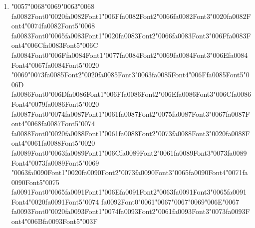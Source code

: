 \documentclass[11pt]{article}
\begin{document}
\begin{enumerate}[label=Q\arabic*., leftmargin=*]
\item {\char"0057}{\char"0068}{\char"0069}{\char"0063}{\char"0068} {\csname fa0082Font0\endcsname\char"0020}{\csname fa0082Font1\endcsname\char"006F}{\csname fa0082Font2\endcsname\char"0066}{\csname fa0082Font3\endcsname\char"0020}{\csname fa0082Font4\endcsname\char"0074}{\csname fa0082Font5\endcsname\char"0068} {\csname fa0083Font0\endcsname\char"0065}{\csname fa0083Font1\endcsname\char"0020}{\csname fa0083Font2\endcsname\char"0066}{\csname fa0083Font3\endcsname\char"006F}{\csname fa0083Font4\endcsname\char"006C}{\csname fa0083Font5\endcsname\char"006C} {\csname fa0084Font0\endcsname\char"006F}{\csname fa0084Font1\endcsname\char"0077}{\csname fa0084Font2\endcsname\char"0069}{\csname fa0084Font3\endcsname\char"006E}{\csname fa0084Font4\endcsname\char"0067}{\csname fa0084Font5\endcsname\char"0020} {\char"0069}{\char"0073}{\csname fa0085Font2\endcsname\char"0020}{\csname fa0085Font3\endcsname\char"0063}{\csname fa0085Font4\endcsname\char"006F}{\csname fa0085Font5\endcsname\char"006D} {\csname fa0086Font0\endcsname\char"006D}{\csname fa0086Font1\endcsname\char"006F}{\csname fa0086Font2\endcsname\char"006E}{\csname fa0086Font3\endcsname\char"006C}{\csname fa0086Font4\endcsname\char"0079}{\csname fa0086Font5\endcsname\char"0020} {\csname fa0087Font0\endcsname\char"0074}{\csname fa0087Font1\endcsname\char"0061}{\csname fa0087Font2\endcsname\char"0075}{\csname fa0087Font3\endcsname\char"0067}{\csname fa0087Font4\endcsname\char"0068}{\csname fa0087Font5\endcsname\char"0074} {\csname fa0088Font0\endcsname\char"0020}{\csname fa0088Font1\endcsname\char"0061}{\csname fa0088Font2\endcsname\char"0073}{\csname fa0088Font3\endcsname\char"0020}{\csname fa0088Font4\endcsname\char"0061}{\csname fa0088Font5\endcsname\char"0020} {\csname fa0089Font0\endcsname\char"0063}{\csname fa0089Font1\endcsname\char"006C}{\csname fa0089Font2\endcsname\char"0061}{\csname fa0089Font3\endcsname\char"0073}{\csname fa0089Font4\endcsname\char"0073}{\csname fa0089Font5\endcsname\char"0069} {\char"0063}{\csname fa0090Font1\endcsname\char"0020}{\csname fa0090Font2\endcsname\char"0073}{\csname fa0090Font3\endcsname\char"0065}{\csname fa0090Font4\endcsname\char"0071}{\csname fa0090Font5\endcsname\char"0075} {\csname fa0091Font0\endcsname\char"0065}{\csname fa0091Font1\endcsname\char"006E}{\csname fa0091Font2\endcsname\char"0063}{\csname fa0091Font3\endcsname\char"0065}{\csname fa0091Font4\endcsname\char"0020}{\csname fa0091Font5\endcsname\char"0074} {\csname fa0092Font0\endcsname\char"0061}{\char"0067}{\char"0067}{\char"0069}{\char"006E}{\char"0067} {\csname fa0093Font0\endcsname\char"0020}{\csname fa0093Font1\endcsname\char"0074}{\csname fa0093Font2\endcsname\char"0061}{\csname fa0093Font3\endcsname\char"0073}{\csname fa0093Font4\endcsname\char"006B}{\csname fa0093Font5\endcsname\char"003F}


\end{enumerate}
\end{document}
